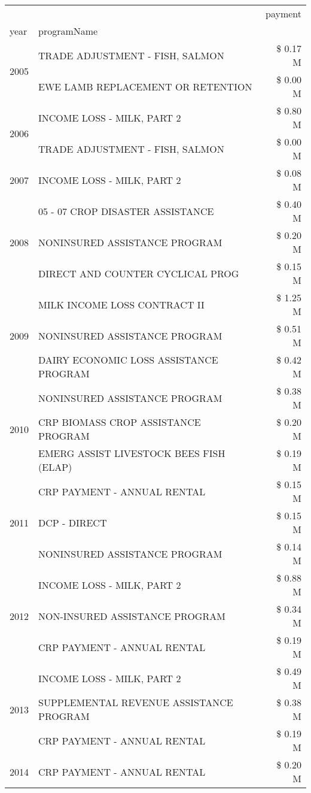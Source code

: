 \begin{tabular}{llr}
\toprule
 &  & payment \\
year & programName &  \\
\midrule
\multirow[t]{2}{*}{2005} & TRADE ADJUSTMENT - FISH, SALMON & \$ 0.17 M \\
 & EWE LAMB REPLACEMENT OR RETENTION & \$ 0.00 M \\
\cline{1-3}
\multirow[t]{2}{*}{2006} & INCOME LOSS - MILK, PART 2 & \$ 0.80 M \\
 & TRADE ADJUSTMENT - FISH, SALMON & \$ 0.00 M \\
\cline{1-3}
2007 & INCOME LOSS - MILK, PART 2 & \$ 0.08 M \\
\cline{1-3}
\multirow[t]{3}{*}{2008} & 05 - 07 CROP DISASTER ASSISTANCE & \$ 0.40 M \\
 & NONINSURED ASSISTANCE PROGRAM & \$ 0.20 M \\
 & DIRECT AND COUNTER CYCLICAL PROG & \$ 0.15 M \\
\cline{1-3}
\multirow[t]{3}{*}{2009} & MILK INCOME LOSS CONTRACT II & \$ 1.25 M \\
 & NONINSURED ASSISTANCE PROGRAM & \$ 0.51 M \\
 & DAIRY ECONOMIC LOSS ASSISTANCE PROGRAM & \$ 0.42 M \\
\cline{1-3}
\multirow[t]{3}{*}{2010} & NONINSURED ASSISTANCE PROGRAM & \$ 0.38 M \\
 & CRP BIOMASS CROP ASSISTANCE PROGRAM & \$ 0.20 M \\
 & EMERG ASSIST LIVESTOCK BEES FISH (ELAP) & \$ 0.19 M \\
\cline{1-3}
\multirow[t]{3}{*}{2011} & CRP PAYMENT - ANNUAL RENTAL & \$ 0.15 M \\
 & DCP - DIRECT & \$ 0.15 M \\
 & NONINSURED ASSISTANCE PROGRAM & \$ 0.14 M \\
\cline{1-3}
\multirow[t]{3}{*}{2012} & INCOME LOSS - MILK, PART 2 & \$ 0.88 M \\
 & NON-INSURED ASSISTANCE PROGRAM & \$ 0.34 M \\
 & CRP PAYMENT - ANNUAL RENTAL & \$ 0.19 M \\
\cline{1-3}
\multirow[t]{3}{*}{2013} & INCOME LOSS - MILK, PART 2 & \$ 0.49 M \\
 & SUPPLEMENTAL REVENUE ASSISTANCE PROGRAM & \$ 0.38 M \\
 & CRP PAYMENT - ANNUAL RENTAL & \$ 0.19 M \\
\cline{1-3}
\multirow[t]{3}{*}{2014} & CRP PAYMENT - ANNUAL RENTAL & \$ 0.20 M \\

\end{tabular}
